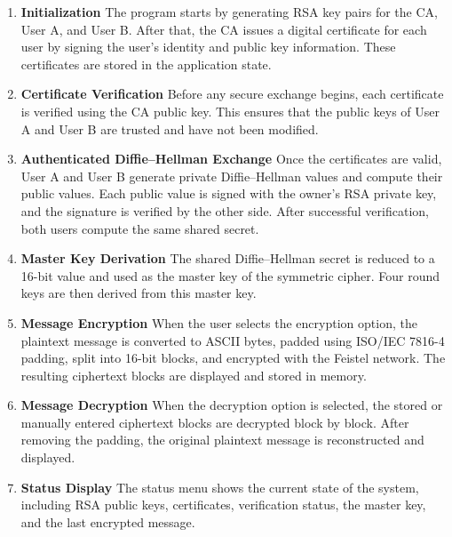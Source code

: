 \documentclass[12pt]{article}
\begin{document}
\begin{enumerate}
    \item \textbf{Initialization}
    \newline
    The program starts by generating RSA key pairs for the CA, User A, and User B. After that, the CA issues a digital certificate for each user by signing the user's identity and public key information. These certificates are stored in the application state.

    \item \textbf{Certificate Verification}
    \newline
    Before any secure exchange begins, each certificate is verified using the CA public key. This ensures that the public keys of User A and User B are trusted and have not been modified.

    \item \textbf{Authenticated Diffie--Hellman Exchange}
    \newline
    Once the certificates are valid, User A and User B generate private Diffie--Hellman values and compute their public values. Each public value is signed with the owner's RSA private key, and the signature is verified by the other side. After successful verification, both users compute the same shared secret.

    \item \textbf{Master Key Derivation}
    \newline
    The shared Diffie--Hellman secret is reduced to a 16-bit value and used as the master key of the symmetric cipher. Four round keys are then derived from this master key.

    \item \textbf{Message Encryption}
    \newline
    When the user selects the encryption option, the plaintext message is converted to ASCII bytes, padded using ISO/IEC 7816-4 padding, split into 16-bit blocks, and encrypted with the Feistel network. The resulting ciphertext blocks are displayed and stored in memory.

    \item \textbf{Message Decryption}
    \newline
    When the decryption option is selected, the stored or manually entered ciphertext blocks are decrypted block by block. After removing the padding, the original plaintext message is reconstructed and displayed.

    \item \textbf{Status Display}
    \newline
    The status menu shows the current state of the system, including RSA public keys, certificates, verification status, the master key, and the last encrypted message.
\end{enumerate}
\end{document}
